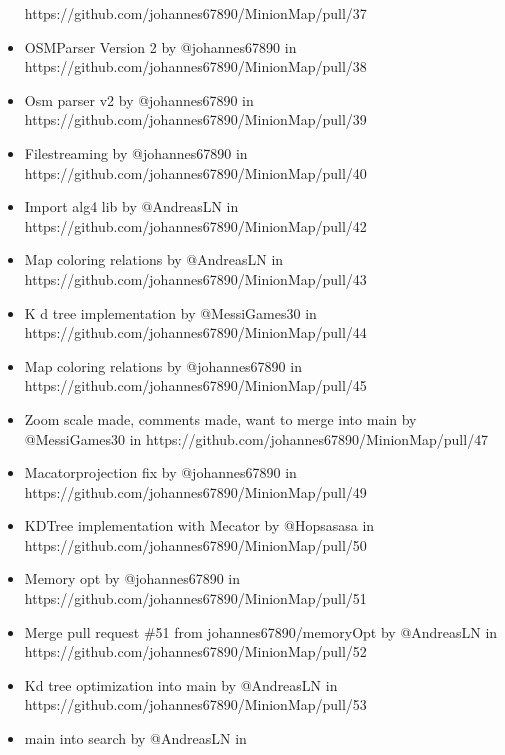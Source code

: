 \begin{itemize}
  https://github.com/johannes67890/MinionMap/pull/37
\item
  OSMParser Version 2 by @johannes67890 in\\
  https://github.com/johannes67890/MinionMap/pull/38
\item
  Osm parser v2 by @johannes67890 in\\
  https://github.com/johannes67890/MinionMap/pull/39
\item
  Filestreaming by @johannes67890 in\\
  https://github.com/johannes67890/MinionMap/pull/40
\item
  Import alg4 lib by @AndreasLN in\\
  https://github.com/johannes67890/MinionMap/pull/42
\item
  Map coloring relations by @AndreasLN in\\
  https://github.com/johannes67890/MinionMap/pull/43
\item
  K d tree implementation by @MessiGames30 in\\
  https://github.com/johannes67890/MinionMap/pull/44
\item
  Map coloring relations by @johannes67890 in\\
  https://github.com/johannes67890/MinionMap/pull/45
\item
  Zoom scale made, comments made, want to merge into main by\\
  @MessiGames30 in https://github.com/johannes67890/MinionMap/pull/47
\item
  Macatorprojection fix by @johannes67890 in\\
  https://github.com/johannes67890/MinionMap/pull/49
\item
  KDTree implementation with Mecator by @Hopsasasa in\\
  https://github.com/johannes67890/MinionMap/pull/50
\item
  Memory opt by @johannes67890 in\\
  https://github.com/johannes67890/MinionMap/pull/51
\item
  Merge pull request \#51 from johannes67890/memoryOpt by @AndreasLN in\\
  https://github.com/johannes67890/MinionMap/pull/52
\item
  Kd tree optimization into main by @AndreasLN in\\
  https://github.com/johannes67890/MinionMap/pull/53
\item
  main into search by @AndreasLN in\\

\end{itemize}
